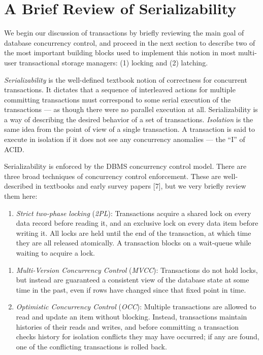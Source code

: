\documentclass[b5paper,11pt,twoside,openright]{book}
\begin{document}
\hypertarget{a-brief-review-of-serializability}{%
\section{A Brief Review of
Serializability}\label{a-brief-review-of-serializability}}

We begin our discussion of transactions by briefly reviewing the main
goal of database concurrency control, and proceed in the next section to
describe two of the most important building blocks used to implement
this notion in most multi-user transactional storage managers:
(1) locking and (2) latching.

\emph{Serializability} is the well-defined textbook notion of
correctness for concurrent transactions. It dictates that a sequence of
interleaved actions for multiple committing transactions must correspond
to some serial execution of the transactions --- as though there were no
parallel execution at all. Serializability is a way of describing the
desired behavior of a set of transactions. \emph{Isolation} is the same
idea from the point of view of a single transaction. A transaction is
said to execute in isolation if it does not see any concurrency
anomalies --- the ``I'' of ACID.

Serializability is enforced by the DBMS concurrency control model. There
are three broad techniques of concurrency control enforcement. These are
well-described in textbooks and early survey papers {[}7{]}, but we very
briefly review them here:

\begin{enumerate}
\def\labelenumi{\arabic{enumi}.}

\item
  \emph{Strict two-phase locking} (\emph{2PL}): Transactions acquire a
  shared lock on every data record before reading it, and an exclusive
  lock on every data item before writing it. All locks are held until
  the end of the transaction, at which time they are all released
  atomically. A transaction blocks on a wait-queue while waiting to
  acquire a lock.
\end{enumerate}

\begin{enumerate}
\def\labelenumi{\arabic{enumi}.}
\setcounter{enumi}{1}
\item
  \emph{Multi-Version Concurrency Control} (\emph{MVCC}): Transactions
  do not hold locks, but instead are guaranteed a consistent view of the
  database state at some time in the past, even if rows have changed
  since that fixed point in time.
\item
  \emph{Optimistic Concurrency Control} (\emph{OCC}): Multiple
  transactions are allowed to read and update an item without blocking.
  Instead, transactions maintain histories of their reads and writes,
  and before committing a transaction checks history for isolation
  conflicts they may have occurred; if any are found, one of the
  conflicting transactions is rolled back.
\end{enumerate}
\end{document}
